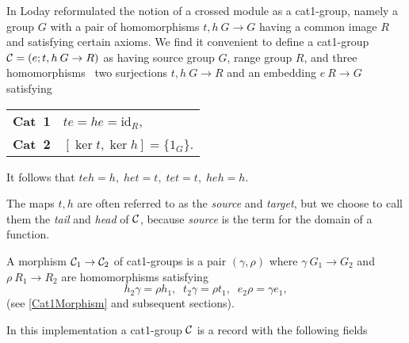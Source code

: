 \newpage


%

In \cite{xmodL1} Loday  reformulated the notion of  a crossed module as  a
cat1-group, namely a group $G$ with a pair of homomorphisms $t,h
\: G \to G$ having a  common image $R$  and satisfying certain axioms.
We find it convenient to  define a cat1-group  ${\cal C} = (e;t,h \: G
\to R  )$ as  having  source  group $G$,  range group  $R$,  and three
homomorphisms\: \ two surjections $t,h \: G \to R$ and an embedding $e
\: R \to G$ satisfying\:
\begin{center}
\begin{tabular}{r l}
\textbf{Cat\ 1\:}  &  $te = he = \mathrm{id}_R $, \\
\textbf{Cat\ 2\:}  &  $[\ker t, \ker h] = \{ 1_G \}$.
\end{tabular}
\end{center}
It follows that  $teh = h, \; het = t, \; tet = t, \; heh = h$.

The maps $t,h$ are often   referred to as  the  {\em source} and  {\em
target}, but we choose to  call them the {\em  tail} and {\em head} of
${\cal C}$, because {\em source} is the {\GAP}  term for the domain of
a function.


A  morphism  ${\cal  C}_1 \to {\cal  C}_2$  of  cat1-groups is  a pair
$(\gamma, \rho)$  where $\gamma \: G_1 \to  G_2$ and  $\rho \: R_1 \to
R_2$ are homomorphisms satisfying  $$ h_2 \gamma  = \rho h_1, \;\; t_2
\gamma   =   \rho   t_1, \;\;  e_2    \rho  =   \gamma  e_1,  $$  (see
\ref{Cat1Morphism} and subsequent sections).

In this  implementation a cat1-group $ {\cal  C}$ is a record with the
following fields\:

